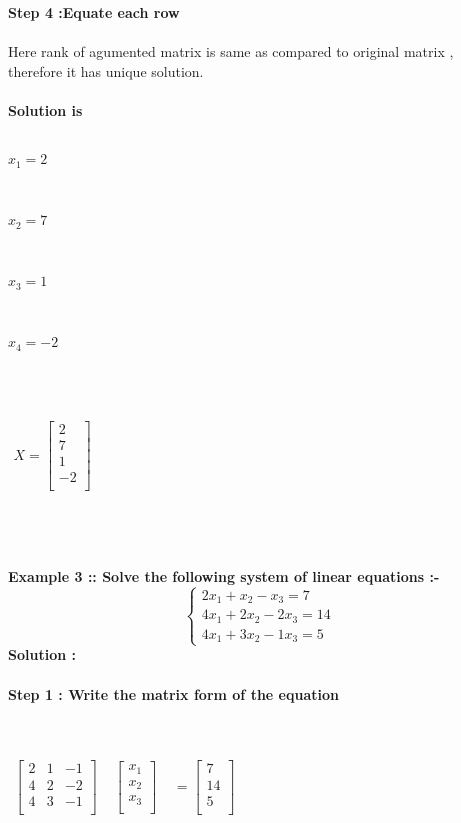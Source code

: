 \documentclass[15pt]{article}
\begin{document}
\textbf{Step 4 :Equate each row  }\\
\\
\textrm{Here rank of agumented matrix is same as compared to original matrix , therefore it has unique solution.}
\\
\\
\textbf{Solution is} 
\\
\\
\centerline{$ x_1 = 2 $}\\
\centerline{$ x_2 = 7 $}\\
\centerline{$  x_3 = 1$}\\
\centerline{$  x_4 = -2$}
\\
\\
\centerline{
$\begin{matrix}
X=
\begin{bmatrix}
2\\
7\\
1\\
-2\\
\end{bmatrix}
\end{matrix}$}
\\
\\
\\
\textbf{Example 3 :: Solve the following system of linear equations :- }
\[
\left\{ 
\begin{array}{c}
2x_1+x_2-x_3=7 \\ 
4x_1+2x_2-2x_3=14\\ 
4x_1+3x_2-1x_3=5
\end{array}
\right. 
\]
\textbf{Solution :}\\
\\
\hspace{1.5cm}
\textbf{Step 1 : Write the matrix form of the equation }\\
\\
\\
\centerline{
$\begin{matrix}
\begin{bmatrix}
2 &  1 & -1\\
4 &  2 &  -2\\
4 &  3 & -1\\
\end{bmatrix}
\end{matrix}$
$\begin{matrix}
\begin{bmatrix}
x_1\\
x_2\\
x_3\\
\end{bmatrix}
\end{matrix}$
$\begin{matrix}
=
\begin{bmatrix}
7\\
14\\
5\\
\end{bmatrix}
\end{matrix}$}\\ \\ \\
\end{document}
